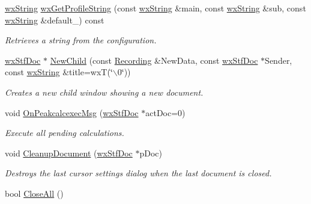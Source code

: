 \begin{DoxyCompactItemize}
\hyperlink{classwxString}{wxString} \hyperlink{classwxStfApp_a509da5804564d52e34d87a77f43c4aa7}{wxGetProfileString} (const \hyperlink{classwxString}{wxString} \&main, const \hyperlink{classwxString}{wxString} \&sub, const \hyperlink{classwxString}{wxString} \&default\_\-) const 
\begin{DoxyCompactList}\small\item\em Retrieves a string from the configuration. \item\end{DoxyCompactList}\item 
\hyperlink{classwxStfDoc}{wxStfDoc} $\ast$ \hyperlink{classwxStfApp_ac38d9f10644fef847d50cfac42353c38}{NewChild} (const \hyperlink{classRecording}{Recording} \&NewData, const \hyperlink{classwxStfDoc}{wxStfDoc} $\ast$Sender, const \hyperlink{classwxString}{wxString} \&title=wxT(\char`\"{}$\backslash$0\char`\"{}))
\begin{DoxyCompactList}\small\item\em Creates a new child window showing a new document. \item\end{DoxyCompactList}\item 
void \hyperlink{classwxStfApp_a584396d82492d98d08c74689a1adfbc3}{OnPeakcalcexecMsg} (\hyperlink{classwxStfDoc}{wxStfDoc} $\ast$actDoc=0)
\begin{DoxyCompactList}\small\item\em Execute all pending calculations. \item\end{DoxyCompactList}\item 
void \hyperlink{classwxStfApp_aad9c9b808e1568f9f4e4266be1e7c7b9}{CleanupDocument} (\hyperlink{classwxStfDoc}{wxStfDoc} $\ast$pDoc)
\begin{DoxyCompactList}\small\item\em Destroys the last cursor settings dialog when the last document is closed. \item\end{DoxyCompactList}\item 
\hypertarget{classwxStfApp_a7a112fcc6db87597de9adcc8987c6355}{
bool \hyperlink{classwxStfApp_a7a112fcc6db87597de9adcc8987c6355}{CloseAll} ()}
\label{classwxStfApp_a7a112fcc6db87597de9adcc8987c6355}


\end{DoxyCompactItemize}
